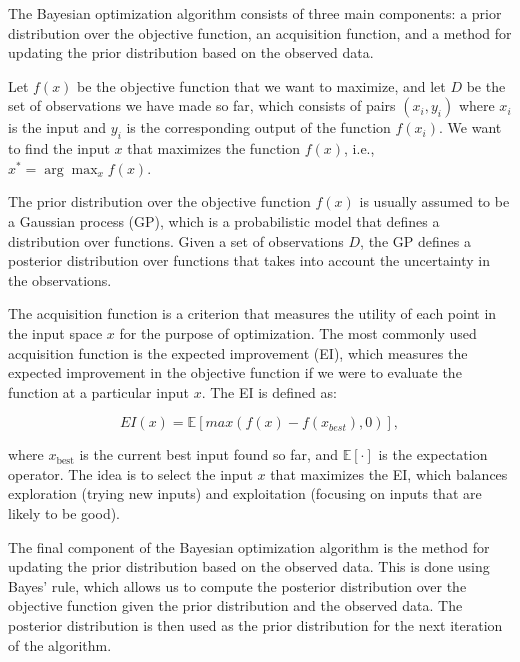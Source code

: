 The Bayesian optimization algorithm consists of three main components: a prior distribution over the objective function, an acquisition function, and a method for updating the prior distribution based on the observed data.

Let $f(x)$ be the objective function that we want to maximize, and let $D$ be the set of observations we have made so far, which consists of pairs $(x_i, y_i)$ where $x_i$ is the input and $y_i$ is the corresponding output of the function $f(x_i)$. We want to find the input $x$ that maximizes the function $f(x)$, i.e., $x^* = \arg\max_x f(x)$.

The prior distribution over the objective function $f(x)$ is usually assumed to be a Gaussian process (GP), which is a probabilistic model that defines a distribution over functions. Given a set of observations $D$, the GP defines a posterior distribution over functions that takes into account the uncertainty in the observations.

The acquisition function is a criterion that measures the utility of each point in the input space $x$ for the purpose of optimization. The most commonly used acquisition function is the expected improvement (EI), which measures the expected improvement in the objective function if we were to evaluate the function at a particular input $x$. The EI is defined as:

\[ EI(x) = \mathbb{E}[max(f(x) - f(x_{best}), 0)], \]

where $x_{\text{best}}$ is the current best input found so far, and $\mathbb{E}[\cdot]$ is the expectation operator. The idea is to select the input $x$ that maximizes the EI, which balances exploration (trying new inputs) and exploitation (focusing on inputs that are likely to be good).

The final component of the Bayesian optimization algorithm is the method for updating the prior distribution based on the observed data. This is done using Bayes' rule, which allows us to compute the posterior distribution over the objective function given the prior distribution and the observed data. The posterior distribution is then used as the prior distribution for the next iteration of the algorithm.
